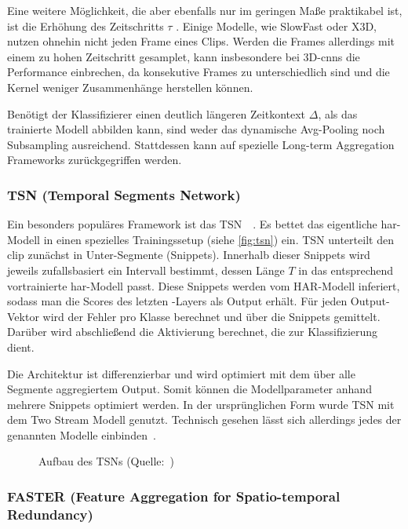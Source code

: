 Eine weitere Möglichkeit, die aber ebenfalls nur im geringen Maße praktikabel ist, ist die Erhöhung des Zeitschritts $\tau$ \cite{Ng15}.
Einige Modelle, wie SlowFast oder X3D, nutzen ohnehin nicht jeden Frame eines Clips.
Werden die Frames allerdings mit einem zu hohen Zeitschritt gesamplet, kann insbesondere bei 3D-\glspl{cnn} die Performance einbrechen, da konsekutive Frames zu unterschiedlich sind und die Kernel weniger Zusammenhänge herstellen können.

Benötigt der Klassifizierer einen deutlich längeren Zeitkontext $\Delta$, als das trainierte Modell abbilden kann, sind weder das dynamische Avg-Pooling noch Subsampling ausreichend.
Stattdessen kann auf spezielle Long-term Aggregation Frameworks zurückgegriffen werden.

\subsubsection*{TSN (Temporal Segments Network)}

Ein besonders populäres Framework ist das TSN~\cite{Wang16}~\cite{Wang19}.
Es bettet das eigentliche \gls{har}-Modell in einen spezielles Trainingssetup (siehe \autoref{fig:tsn}) ein.
TSN unterteilt den \gls{clip} zunächst in Unter-Segmente (Snippets).
Innerhalb dieser Snippets wird jeweils zufallsbasiert ein Intervall bestimmt, dessen Länge $T$ in das entsprechend vortrainierte \gls{har}-Modell passt.
Diese Snippets werden vom HAR-Modell inferiert, sodass man die Scores des letzten \fc-Layers als Output erhält.
Für jeden Output-Vektor wird der Fehler pro Klasse berechnet und über die Snippets gemittelt.
Darüber wird abschließend die Aktivierung berechnet, die zur Klassifizierung dient.

Die Architektur ist differenzierbar und wird optimiert mit dem über alle Segmente aggregiertem Output.
Somit können die Modellparameter anhand mehrere Snippets optimiert werden.
In der ursprünglichen Form wurde TSN mit dem Two Stream Modell genutzt.
Technisch gesehen lässt sich allerdings jedes der genannten Modelle einbinden~\cite{Kothawade19}.

\begin{figure}[h!]
    \centering
    \caption[Aufbau des TSNs]{Aufbau des TSNs (Quelle:~\cite{Wang19})}
    \label{fig:tsn}
\end{figure}

\subsubsection*{FASTER (Feature Aggregation for Spatio-temporal Redundancy)}


